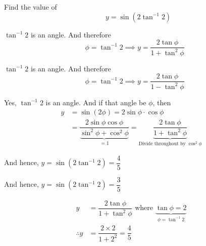 \documentclass[14pt,fleqn]{extarticle}
\begin{document}
 
\begin{problem}
	\statement 
    
    Find the value of 
    \[ \qquad y = \sin \left(2\tan^{-1}2 \right)\]
          
    \begin{step}
  \begin{options} 
     \correct 
     
       $\tan^{-1}2$ is an angle. And therefore 
       \[ \quad \phi = \tan^{-1} 2\implies y = \dfrac{2\tan\phi}{1+\tan^2\phi}\]

     \incorrect
        
        $\tan^{-1}2$ is an angle. And therefore 
       \[ \quad \phi = \tan^{-1} 2\implies y = \dfrac{2\tan\phi}{1-\tan^2\phi}\]
    \end{options} 
     \reason 
     
     Yes, $\tan^{-1} 2$ is an angle. And if that angle be $\phi$, then 
     \begin{align}
	y &= \sin \left(2\phi \right) = 2\sin\phi\cdot\cos\phi \\
	&= \dfrac{2\sin\phi\cos\phi}{\underbrace{\sin^2\phi + \cos^2\phi}_{=1}} = \underbrace{\dfrac{2\tan\phi}{1+\tan^2\phi}}_{\text{Divide throughout by }\cos^2\phi}
\end{align}
       
\end{step}

\begin{step}
  \begin{options} 
     \correct 
       
     And hence, $y = \sin \left(2\tan^{-1} 2 \right) = \dfrac{4}{5}$ 
     \incorrect
     
     And hence, $y = \sin \left(2\tan^{-1} 2 \right) = \dfrac{3}{5}$ 
        
    \end{options} 
     \reason 
     
     \begin{align}
     y &= \dfrac{2\tan\phi}{1+\tan^2\phi} \text{ where } \underbrace{\tan\phi = 2}_{\phi = \tan^{-1} 2} \\
     \therefore y &= \dfrac{2\times 2}{1+2^2} = \dfrac{4}{5}  
\end{align}
     
     
       
\end{step}
\end{problem} 
\end{document}
